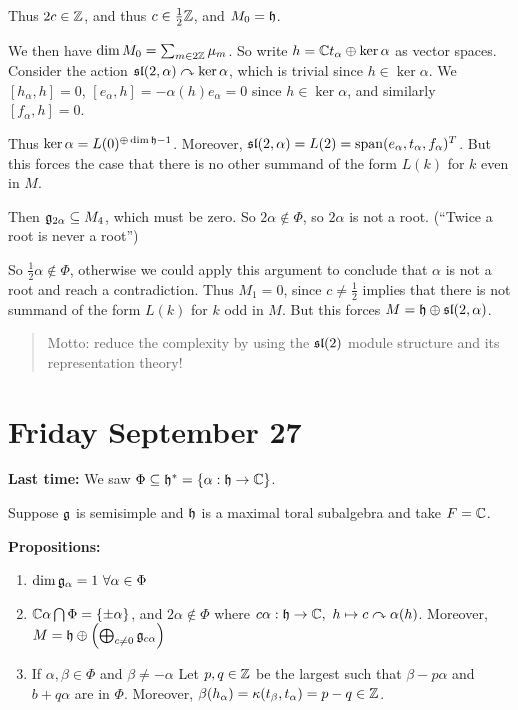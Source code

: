 Thus \(2c \in {\mathbb{Z}}\), and thus \(c \in \frac 1 2 {\mathbb{Z}}\), and
\(M_0 = {\mathfrak{h}}\).

We then have \(\dim M_0 = \sum_{m\in 2{\mathbb{Z}}} \mu_m\). So write
\(h = {\mathbb{C}} t_\alpha \oplus \ker \alpha\) as vector spaces. Consider the
action \({\mathfrak{sl}}(2, \alpha) \curvearrowright \ker \alpha\), which is trivial since
\(h \in \ker \alpha\). We \([h_\alpha, h] = 0\),
\([e_\alpha, h] = -\alpha(h)e_\alpha = 0\) since \(h\in\ker\alpha\), and
similarly \([f_\alpha, h] = 0\).

Thus \(\ker \alpha = L(0)^{\oplus \dim {\mathfrak{h}} - 1}\). Moreover,
\({\mathfrak{sl}}(2, \alpha) = L(2) = \mathrm{span}(e_\alpha, t_\alpha, f_\alpha)^T\).
But this forces the case that there is no other summand of the form
\(L(k)\) for \(k\) even in \(M\).

Then \({\mathfrak{g}}_{2\alpha} \subseteq M_4\), which must be zero. So
\(2\alpha \not\in \Phi\), so \(2\alpha\) is not a root. (``Twice a root
is never a root'')

So \(\frac 1 2 \alpha \not\in \Phi\), otherwise we could apply this
argument to conclude that \(\alpha\) is not a root and reach a
contradiction. Thus \(M_1 = 0\), since \(c\neq \frac 1 2\) implies that
there is not summand of the form \(L(k)\) for \(k\) odd in \(M\). But
this forces \(M = {\mathfrak{h}} \oplus {\mathfrak{sl}}(2, \alpha)\).

\begin{quote}
Motto: reduce the complexity by using the \({\mathfrak{sl}}(2)\) module structure
and its representation theory!
\end{quote}

\hypertarget{friday-september-27}{%
\section{Friday September 27}\label{friday-september-27}}

\textbf{Last time:} We saw
\(\Phi \subseteq {\mathfrak{h}}^* = \left\{{\alpha: {\mathfrak{h}} \to {\mathbb{C}}}\right\}\).

Suppose \({\mathfrak{g}}\) is semisimple and \({\mathfrak{h}}\) is a maximal toral
subalgebra and take \(F = {\mathbb{C}}\).

\textbf{Propositions:}

\begin{enumerate}
\def\labelenumi{\alph{enumi}.}
\tightlist
\item
  \(\dim {\mathfrak{g}}_\alpha = 1 ~\forall \alpha \in \Phi\)
\item
  \({\mathbb{C}} \alpha \bigcap \Phi = \left\{{\pm \alpha}\right\}\), and
  \(2\alpha \not\in\Phi\) where
  \(c\alpha: {\mathfrak{h}} \to {\mathbb{C}},~ h \mapsto c\curvearrowright \alpha(h)\). Moreover,
  \(M = {\mathfrak{h}} \oplus \left( \bigoplus_{c\neq0} {\mathfrak{g}}_{c\alpha} \right)\)
\item
  If \(\alpha, \beta \in \Phi\) and \(\beta \neq -\alpha\) Let
  \(p,q \in {\mathbb{Z}}\) be the largest such that \(\beta -p\alpha\) and
  \(b + q\alpha\) are in \(\Phi\). Moreover,
  \(\beta(h_\alpha) = \kappa(t_\beta, t_\alpha) = p-q \in {\mathbb{Z}}\).
\end{enumerate}


